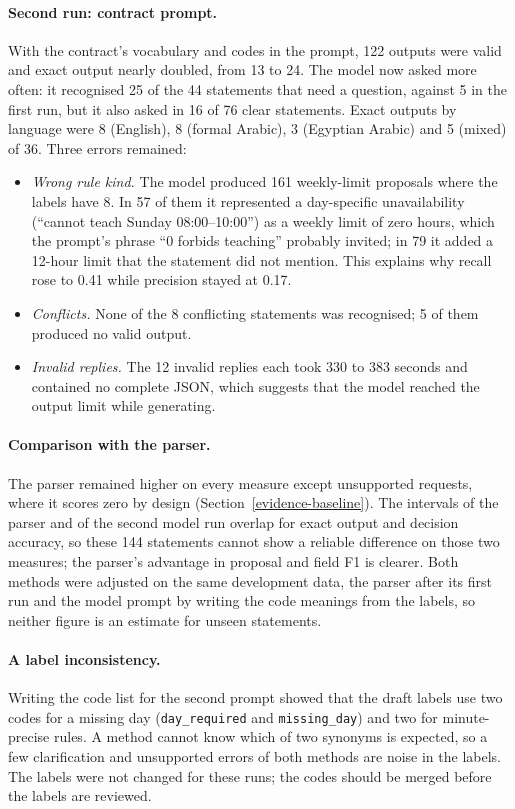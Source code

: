 \paragraph{Second run: contract prompt.} With the contract's vocabulary and codes in the prompt, 122 outputs were valid and exact output nearly doubled, from 13 to 24. The model now asked more often: it recognised 25 of the 44 statements that need a question, against 5 in the first run, but it also asked in 16 of 76 clear statements. Exact outputs by language were 8 (English), 8 (formal Arabic), 3 (Egyptian Arabic) and 5 (mixed) of 36. Three errors remained:
\begin{itemize}
\item \emph{Wrong rule kind.} The model produced 161 weekly-limit proposals where the labels have 8. In 57 of them it represented a day-specific unavailability (``cannot teach Sunday 08:00--10:00'') as a weekly limit of zero hours, which the prompt's phrase ``0 forbids teaching'' probably invited; in 79 it added a 12-hour limit that the statement did not mention. This explains why recall rose to 0.41 while precision stayed at 0.17.
\item \emph{Conflicts.} None of the 8 conflicting statements was recognised; 5 of them produced no valid output.
\item \emph{Invalid replies.} The 12 invalid replies each took 330 to 383 seconds and contained no complete JSON, which suggests that the model reached the output limit while generating.
\end{itemize}

\paragraph{Comparison with the parser.} The parser remained higher on every measure except unsupported requests, where it scores zero by design (Section~\ref{evidence-baseline}). The intervals of the parser and of the second model run overlap for exact output and decision accuracy, so these 144 statements cannot show a reliable difference on those two measures; the parser's advantage in proposal and field F1 is clearer. Both methods were adjusted on the same development data, the parser after its first run and the model prompt by writing the code meanings from the labels, so neither figure is an estimate for unseen statements.

\paragraph{A label inconsistency.} Writing the code list for the second prompt showed that the draft labels use two codes for a missing day (\texttt{day\_required} and \texttt{missing\_day}) and two for minute-precise rules. A method cannot know which of two synonyms is expected, so a few clarification and unsupported errors of both methods are noise in the labels. The labels were not changed for these runs; the codes should be merged before the labels are reviewed.

